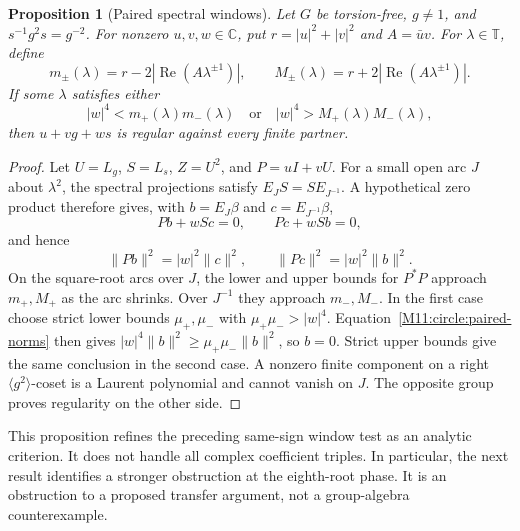 \documentclass[11pt,a4paper,oneside]{report}
\newtheorem{proposition}[theorem]{Proposition}
\theoremstyle{definition}
\theoremstyle{remark}
\newcommand{\C}{\mathbb C}
\newcommand{\T}{\mathbb T}
\begin{document}
\begin{proposition}[Paired spectral windows]\label{M11:circle:windows}
Let $G$ be torsion-free, $g\ne1$, and $s^{-1}g^2s=g^{-2}$.
For nonzero $u,v,w\in\C$, put $r=|u|^2+|v|^2$ and $A=\bar uv$.
For $\lambda\in\T$, define
\[
m_\pm(\lambda)=r-2|\operatorname{Re}(A\lambda^{\pm1})|,
\qquad M_\pm(\lambda)=r+2|\operatorname{Re}(A\lambda^{\pm1})|.
\]
If some $\lambda$ satisfies either
\[
|w|^4<m_+(\lambda)m_-(\lambda)
\quad\text{or}\quad
|w|^4>M_+(\lambda)M_-(\lambda),
\]
then $u+vg+ws$ is regular against every finite partner.
\end{proposition}
\begin{proof}
Let $U=L_g$, $S=L_s$, $Z=U^2$, and $P=uI+vU$. For a small
open arc $J$ about $\lambda^2$, the spectral projections satisfy
$E_JS=S E_{J^{-1}}$. A hypothetical zero product therefore gives,
with $b=E_J\beta$ and $c=E_{J^{-1}}\beta$,
\[
Pb+wSc=0,\qquad Pc+wSb=0,
\]
and hence
\begin{equation}\label{M11:circle:paired-norms}
\|Pb\|^2=|w|^2\|c\|^2,
\qquad \|Pc\|^2=|w|^2\|b\|^2.
\end{equation}
On the square-root arcs over $J$, the lower and upper bounds
for $P^*P$ approach $m_+,M_+$ as the arc shrinks. Over
$J^{-1}$ they approach $m_-,M_-$. In the first case choose
strict lower bounds $\mu_+,\mu_-$ with
$\mu_+\mu_->|w|^4$. Equation~\eqref{M11:circle:paired-norms}
then gives $|w|^4\|b\|^2\ge\mu_+\mu_-\|b\|^2$, so $b=0$.
Strict upper bounds give the same conclusion in the second case.
A nonzero finite component on a right $\langle g^2\rangle$-coset
is a Laurent polynomial and cannot vanish on $J$. The opposite
group proves regularity on the other side.
\end{proof}

This proposition refines the preceding same-sign window test as
an analytic criterion. It does not handle all complex coefficient
triples. In particular, the next result identifies a stronger
obstruction at the eighth-root phase. It is an obstruction to a
proposed transfer argument, not a group-algebra counterexample.
\end{document}
